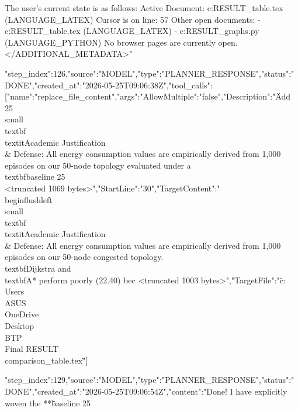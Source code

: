 \begin{table}[t]
{\begin{table}[t]
{{{{{{{{{{{The user's current state is as follows:
Active Document: c:\Users\ASUS\OneDrive\Desktop\BTP\Final RESULT\comparison_table.tex (LANGUAGE_LATEX)
Cursor is on line: 57
Other open documents:
- c:\Users\ASUS\OneDrive\Desktop\BTP\Final RESULT\comparison_table.tex (LANGUAGE_LATEX)
- c:\Users\ASUS\OneDrive\Desktop\BTP\Final RESULT\generate_graphs.py (LANGUAGE_PYTHON)
No browser pages are currently open.
</ADDITIONAL_METADATA>"}
{"step_index":126,"source":"MODEL","type":"PLANNER_RESPONSE","status":"DONE","created_at":"2026-05-25T09:06:38Z","tool_calls":[{"name":"replace_file_content","args":{"AllowMultiple":"false","Description":"\"Add 25%
\\small \\textbf{\\textit{Academic Justification \\& Defense:}} All energy consumption values are empirically derived from 1,000 episodes on our 50-node topology evaluated under a \\textbf{baseline 25\\%
<truncated 1069 bytes>","StartLine":"30","TargetContent":"\"\\begin{flushleft}\
\\small \\textbf{\\textit{Academic Justification \\& Defense:}} All energy consumption values are empirically derived from 1,000 episodes on our 50-node congested topology. \\textbf{Dijkstra} and \\textbf{A*} perform poorly (22.40) bec
<truncated 1003 bytes>","TargetFile":"\"c:\\Users\\ASUS\\OneDrive\\Desktop\\BTP\\Final RESULT\\comparison_table.tex\""}}]}
{"step_index":129,"source":"MODEL","type":"PLANNER_RESPONSE","status":"DONE","created_at":"2026-05-25T09:06:54Z","content":"Done! I have explicitly woven the **\"baseline 25%

}}}}}}}}}}}}
\end{table}}
\end{table}
